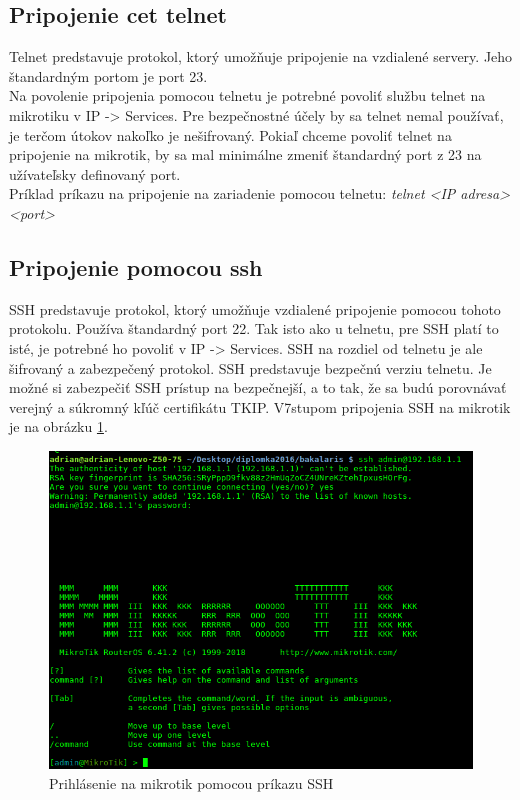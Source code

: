 \subsection{Pripojenie cet telnet}
Telnet predstavuje protokol, ktorý umožňuje pripojenie na vzdialené servery. Jeho štandardným portom je port 23. \\
Na povolenie pripojenia pomocou telnetu je potrebné povoliť službu telnet na mikrotiku v IP -> Services. Pre bezpečnostné účely by sa telnet nemal používať, je terčom útokov nakoľko je nešifrovaný. Pokiaľ chceme povoliť telnet na pripojenie na mikrotik, by sa mal minimálne zmeniť štandardný port z 23 na užívateľsky definovaný port.\\
Príklad príkazu na pripojenie na zariadenie pomocou telnetu: \textit{telnet <IP adresa> <port>} 
\subsection{Pripojenie pomocou ssh} 
SSH predstavuje protokol, ktorý umožňuje vzdialené pripojenie pomocou tohoto protokolu. Používa štandardný port 22. Tak isto ako u telnetu, pre SSH platí to isté, je potrebné ho povoliť v IP -> Services. SSH na rozdiel od telnetu je ale šifrovaný  a zabezpečený protokol. SSH predstavuje bezpečnú verziu telnetu. Je možné si zabezpečiť SSH prístup na bezpečnejší, a to tak, že sa budú porovnávať verejný  a súkromný kľúč certifikátu TKIP. V7stupom pripojenia SSH na mikrotik je na obrázku \ref{fig:ssh}. 
\begin{figure}[H]
\centering
\includegraphics[scale=0.4]{../text/ssh.png}
\caption{Prihlásenie na mikrotik pomocou príkazu SSH}
\label{fig:ssh}
\end{figure}
